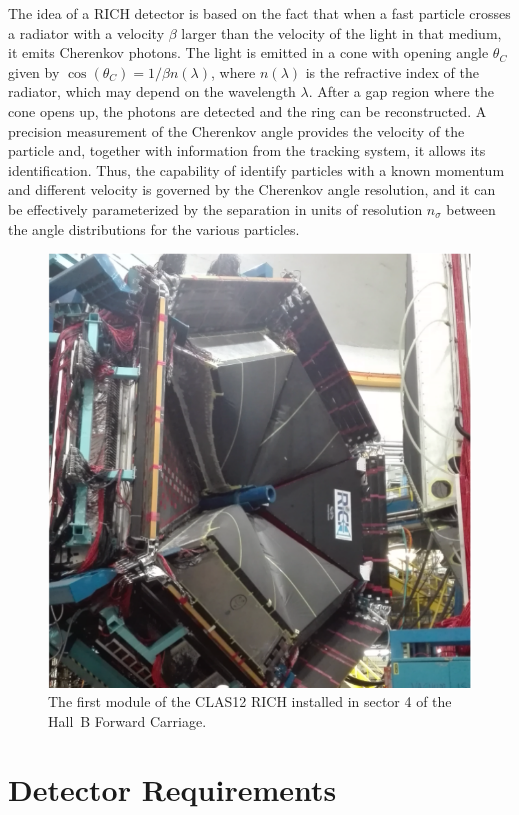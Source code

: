 \documentclass[5p,times,twocolumn]{elsarticle}
\begin{document}
The idea of a RICH detector is based on the fact that when a fast particle crosses a radiator with a velocity $\beta$
larger than the velocity of the light in that medium, it emits Cherenkov photons. The light is emitted in a cone with
opening angle $\theta_C$ given by $\cos(\theta_C)=1/\beta n(\lambda)$, where $n(\lambda)$ is the refractive index
of the radiator, which may depend on the wavelength $\lambda$. After a gap region where the cone opens up, the
photons are detected and the ring can be reconstructed. A precision measurement of the Cherenkov angle provides
the velocity of the particle and, together with information from the tracking system, it allows its identification. Thus,
the capability of identify particles with a known momentum and different velocity is governed by the Cherenkov angle
resolution, and it can be effectively parameterized by the separation in units of resolution $n_{\sigma}$ between the
angle distributions for the various particles.

\begin{figure}[t]
\begin{center}
\includegraphics[width=0.80\columnwidth]{RICH_Installed.pdf}
\end{center}
\caption{The first module of the CLAS12 RICH installed in sector 4 of the Hall~B Forward Carriage.}
\label{Fig:RICHPic}
\end{figure}

\section{Detector Requirements}
\end{document}

